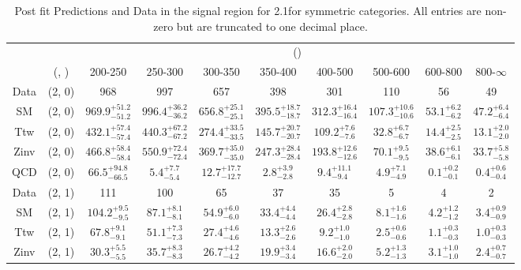 \begin{table}[h!]
\tiny
\centering
\caption{Post fit Predictions and Data in the signal region for 2.1\ifb for symmetric categories. All entries are non-zero but are truncated to one decimal place.\label{tab:predallqcdpost_sig_comb_sym}}
\begin{tabular}
{cccccccccc}
	\hline\hline
	&	& \multicolumn{8}{c}{\scalht (\gev)}\\ 
	&	 (\njet, \nb) & 200-250 & 250-300 & 300-350 & 350-400 & 400-500 & 500-600 & 600-800 & 800-$\infty$ \\ [0.8ex] 
\hline
	Data & (2, 0) & 968 & 997 & 657 & 398 & 301 & 110 & 56 & 49 \\[0.5ex] 
	SM & (2, 0) & $969.9^{+ 51.2 }_{- 51.2 }$ & $996.4^{+ 36.2 }_{- 36.2 }$ & $656.8^{+ 25.1 }_{- 25.1 }$ & $395.5^{+ 18.7 }_{- 18.7 }$ & $312.3^{+ 16.4 }_{- 16.4 }$ & $107.3^{+ 10.6 }_{- 10.6 }$ & $53.1^{+ 6.2 }_{- 6.2 }$ & $47.2^{+ 6.4 }_{- 6.4 }$ \\[0.5ex] 
	Ttw & (2, 0) & $432.1^{+ 57.4 }_{- 57.4 }$ & $440.3^{+ 67.2 }_{- 67.2 }$ & $274.4^{+ 33.5 }_{- 33.5 }$ & $145.7^{+ 20.7 }_{- 20.7 }$ & $109.2^{+ 7.6 }_{- 7.6 }$ & $32.8^{+ 6.7 }_{- 6.7 }$ & $14.4^{+ 2.5 }_{- 2.5 }$ & $13.1^{+ 2.0 }_{- 2.0 }$ \\[0.5ex] 
	Zinv & (2, 0) & $466.8^{+ 58.4 }_{- 58.4 }$ & $550.9^{+ 72.4 }_{- 72.4 }$ & $369.7^{+ 35.0 }_{- 35.0 }$ & $247.3^{+ 28.4 }_{- 28.4 }$ & $193.8^{+ 12.6 }_{- 12.6 }$ & $70.1^{+ 9.5 }_{- 9.5 }$ & $38.6^{+ 6.1 }_{- 6.1 }$ & $33.7^{+ 5.8 }_{- 5.8 }$ \\[0.5ex] 
	QCD & (2, 0) & $66.5^{+ 94.8 }_{- 66.5 }$ & $5.4^{+ 7.7 }_{- 5.4 }$ & $12.7^{+ 17.7 }_{- 12.7 }$ & $2.8^{+ 3.9 }_{- 2.8 }$ & $9.4^{+ 11.1 }_{- 9.4 }$ & $4.9^{+ 7.1 }_{- 4.9 }$ & $0.1^{+ 0.2 }_{- 0.1 }$ & $0.4^{+ 0.6 }_{- 0.4 }$ \\[0.5ex] 
	Data & (2, 1) & 111 & 100 & 65 & 37 & 35 & 5 & 4 & 2 \\[0.5ex] 
	SM & (2, 1) & $104.2^{+ 9.5 }_{- 9.5 }$ & $87.1^{+ 8.1 }_{- 8.1 }$ & $54.9^{+ 6.0 }_{- 6.0 }$ & $33.4^{+ 4.4 }_{- 4.4 }$ & $26.4^{+ 2.8 }_{- 2.8 }$ & $8.1^{+ 1.6 }_{- 1.6 }$ & $4.2^{+ 1.2 }_{- 1.2 }$ & $3.4^{+ 0.9 }_{- 0.9 }$ \\[0.5ex] 
	Ttw & (2, 1) & $67.8^{+ 9.1 }_{- 9.1 }$ & $51.1^{+ 7.3 }_{- 7.3 }$ & $27.4^{+ 4.6 }_{- 4.6 }$ & $13.3^{+ 2.6 }_{- 2.6 }$ & $9.2^{+ 1.0 }_{- 1.0 }$ & $2.5^{+ 0.6 }_{- 0.6 }$ & $1.1^{+ 0.3 }_{- 0.3 }$ & $1.0^{+ 0.3 }_{- 0.3 }$ \\[0.5ex] 
	Zinv & (2, 1) & $30.3^{+ 5.5 }_{- 5.5 }$ & $35.7^{+ 8.3 }_{- 8.3 }$ & $26.7^{+ 4.2 }_{- 4.2 }$ & $19.9^{+ 3.4 }_{- 3.4 }$ & $16.6^{+ 2.0 }_{- 2.0 }$ & $5.2^{+ 1.3 }_{- 1.3 }$ & $3.1^{+ 1.0 }_{- 1.0 }$ & $2.4^{+ 0.7 }_{- 0.7 }$ \\[0.5ex] 

\end{tabular}
\end{table}

